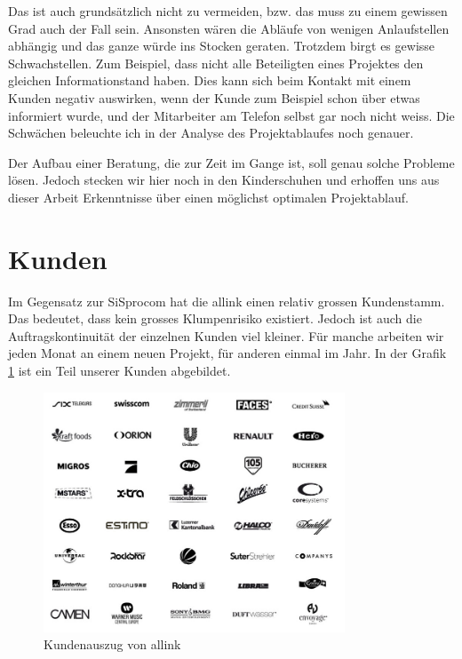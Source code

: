Das ist auch grundsätzlich nicht zu vermeiden, bzw. das muss zu einem gewissen
Grad auch der Fall sein. Ansonsten wären die Abläufe von wenigen Anlaufstellen abhängig
und das ganze würde ins Stocken geraten. Trotzdem birgt es gewisse Schwachstellen.
Zum Beispiel, dass nicht alle Beteiligten eines Projektes den gleichen Informationstand 
haben. Dies kann sich beim Kontakt mit einem Kunden negativ auswirken, wenn der
Kunde zum Beispiel schon über etwas informiert wurde, und der Mitarbeiter am
Telefon selbst gar noch nicht weiss. Die Schwächen beleuchte ich in der Analyse
des Projektablaufes noch genauer.

Der Aufbau einer Beratung, die zur Zeit im Gange ist, soll genau solche Probleme
lösen. Jedoch stecken wir hier noch in den Kinderschuhen und erhoffen uns aus
dieser Arbeit Erkenntnisse über einen möglichst optimalen Projektablauf.

\section{Kunden}
Im Gegensatz zur SiSprocom hat die allink einen relativ grossen Kundenstamm.
Das bedeutet, dass kein grosses Klumpenrisiko existiert. Jedoch ist auch
die Auftragskontinuität der einzelnen Kunden viel kleiner. Für manche arbeiten
wir jeden Monat an einem neuen Projekt, für anderen einmal im Jahr.
In der Grafik \ref{pic:kundenauszug} ist ein Teil unserer Kunden abgebildet.

\begin{figure}[htbp]
\begin{center}
\includegraphics[width=0.8\textwidth,angle=0]{./bilder/analyse/kundenauszug.jpg}
\caption{Kundenauszug von allink}
\label{pic:kundenauszug}
\end{center}
\end{figure}

